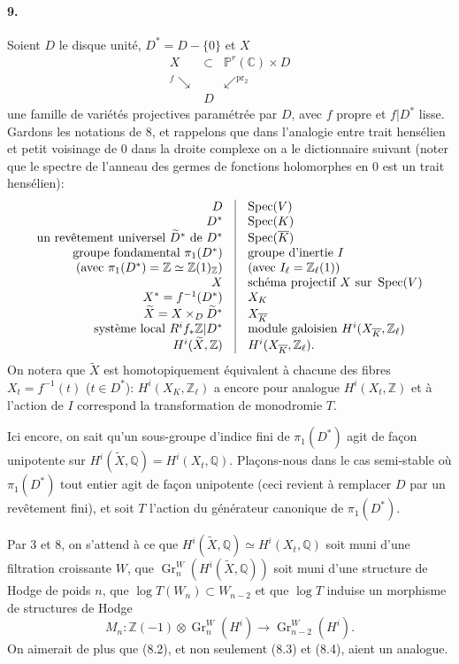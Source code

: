 \documentclass[10pt]{article}
\newcommand{\C}{\mathbb C}
\newcommand{\Q}{\mathbb Q}
\newcommand{\Z}{\mathbb Z}
\newcommand{\Zl}{\mathbb Z_\ell}
\newcommand{\Gr}{\operatorname{Gr}}
\newcommand{\Spec}{\operatorname{Spec}}
\newcommand{\pr}{\operatorname{pr}}
\newcommand{\barK}{\overline{K}}
\newcommand{\wt}{\widetilde}
\begin{document}
\paragraph{9.} Soient $D$ le disque unité, $D^*=D-\{0\}$ et $X$
\[
\begin{array}{ccc}
X&\subset&\mathbb P^r(\C)\times D\\[-0.2em]
{}^{f}\searrow&&\swarrow^{\pr_2}\\[-0.2em]
& D&
\end{array}
\]
une famille de variétés projectives paramétrée par $D$, avec $f$ propre et $f|D^*$ lisse. Gardons les notations de 8, et rappelons que dans l'analogie entre trait hensélien et petit voisinage de $0$ dans la droite complexe on a le dictionnaire suivant (noter que le spectre de l'anneau des germes de fonctions holomorphes en $0$ est un trait hensélien):
\[
\begin{array}{r@{\quad\vrule\quad}l}
D & \Spec(V)\\
D^* & \Spec(K)\\
\text{un revêtement universel }\wt D^*\text{ de }D^* & \Spec(\barK)\\
\text{groupe fondamental }\pi_1(D^*) & \text{groupe d'inertie }I\\
\text{(avec }\pi_1(D^*)=\Z\simeq\Z(1)_\Z\text{)} & \text{(avec }I_\ell=\Zl(1)\text{)}\\
X & \text{schéma projectif }X\text{ sur }\Spec(V)\\
X^*=f^{-1}(D^*) & X_K\\
\wt X=X\times_D\wt D^* & X_{\barK}\\
\text{système local }R^if_*\Z|D^* & \text{module galoisien }H^i(X_{\barK},\Zl)\\
H^i(\wt X,\Z) & H^i(X_{\barK},\Zl).
\end{array}
\]
On notera que $\wt X$ est homotopiquement équivalent à chacune des fibres $X_t=f^{-1}(t)$ ($t\in D^*$): $H^i(X_K,\Zl)$ a encore pour analogue $H^i(X_t,\Z)$ et à l'action de $I$ correspond la transformation de monodromie $T$.

Ici encore, on sait qu'un sous-groupe d'indice fini de $\pi_1(D^*)$ agit de façon unipotente sur $H^i(\wt X,\Q)=H^i(X_t,\Q)$. Plaçons-nous dans le cas semi-stable où $\pi_1(D^*)$ tout entier agit de façon unipotente (ceci revient à remplacer $D$ par un revêtement fini), et soit $T$ l'action du générateur canonique de $\pi_1(D^*)$.

Par 3 et 8, on s'attend à ce que $H^i(\wt X,\Q)\simeq H^i(X_t,\Q)$ soit muni d'une filtration croissante $W$, que $\Gr_n^W(H^i(\wt X,\Q))$ soit muni d'une structure de Hodge de poids $n$, que $\log T(W_n)\subset W_{n-2}$ et que $\log T$ induise un morphisme de structures de Hodge
\[
M_n:\Z(-1)\otimes\Gr_n^W(H^i)\longrightarrow\Gr_{n-2}^W(H^i).
\]
On aimerait de plus que (8.2), et non seulement (8.3) et (8.4), aient un analogue.
\end{document}
